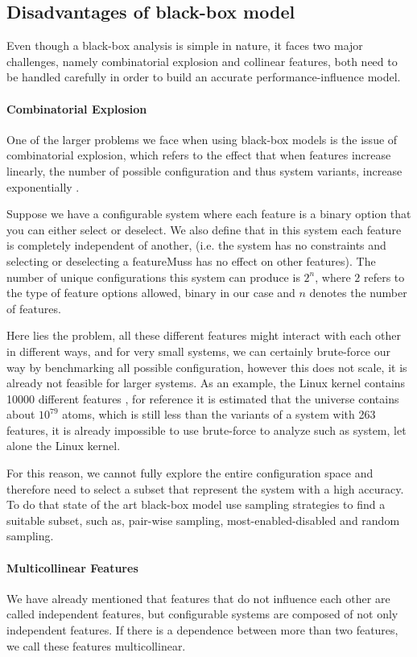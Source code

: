 \subsection{Disadvantages of black-box model}
Even though a black-box analysis is simple in nature, it faces two major challenges, namely combinatorial explosion and collinear features, both need to be
handled carefully in order to build an accurate performance-influence model.

\paragraph{Combinatorial Explosion}
One of the larger problems we face when using black-box models is the issue of combinatorial explosion, 
which refers to the effect that when features increase linearly, the number of possible configuration and thus system variants,
increase exponentially \cite{Combinatorial-explosion}.

Suppose we have a configurable system where each feature is a binary option that you can either select or deselect. We also define 
that in this system each feature is completely independent of another, (i.e. the system has no constraints and selecting or deselecting a featureMuss
has no effect on other features). The number of unique configurations this system can produce is $2^n$, where $2$ refers to
the type of feature options allowed, binary in our case and $n$ denotes the number of features. 

Here lies the problem, all these different features might interact with each other in different ways, and for very small systems,
we can certainly brute-force our way by benchmarking all possible configuration, however this does not scale, it is already not feasible for 
larger systems. As an example, the Linux kernel contains 10000 different features \cite{Linux-Kernel}, for reference it is estimated that the universe
contains about $10^{79}$ atoms, which is still less than the variants of a system with 263 features, it is already impossible to use brute-force to analyze
such as system, let alone the Linux kernel.

For this reason, we cannot fully explore the entire configuration space 
and therefore need to select a subset that represent the system with a high accuracy. To do that state of the art black-box model use sampling
strategies to find a suitable subset, such as, pair-wise sampling, most-enabled-disabled and random sampling.

\paragraph{Multicollinear Features}\label{ColinearF}
We have already mentioned that features that do not influence each other are called independent features, but configurable systems are composed
of not only independent features. If there is a dependence between more than two features, we call these features multicollinear.


